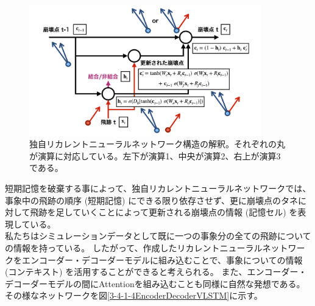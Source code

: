 \begin{figure}[htbp]
 \centering
 \includegraphics[width=0.9\textwidth, clip]{Figure/3Networks/3-4-1-3Interpretation.png}
 \caption[独自リカレントニューラルネットワーク構造の解釈]{独自リカレントニューラルネットワーク構造の解釈。それぞれの丸が演算に対応している。左下が演算1、中央が演算2、右上が演算3である。}
 \label{3-4-1-3Interpretation}
\end{figure}

短期記憶を破棄する事によって、独自リカレントニューラルネットワークでは、事象中の飛跡の順序 (短期記憶) にできる限り依存させず、更に崩壊点のタネに対して飛跡を足していくことによって更新される崩壊点の情報 (記憶セル) を表現している。\\

私たちはシミュレーションデータとして既に一つの事象分の全ての飛跡についての情報を持っている。
したがって、作成したリカレントニューラルネットワークをエンコーダー・デコーダーモデルに組み込むことで、事象についての情報 (コンテキスト) を活用することができると考えられる。
また、エンコーダー・デコーダーモデルの間にAttentionを組み込むことも同様に自然な発想である。
その様なネットワークを図\ref{3-4-1-4EncoderDecoderVLSTM}に示す。

